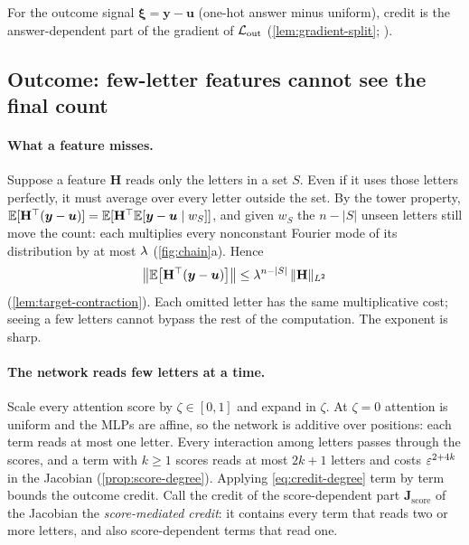 For the outcome signal $\bm\xi=\bm y-\bm u$ (one-hot answer minus uniform), credit is the answer-dependent part of the gradient of
$\mathcal L_{\mathrm{out}}$ (\cref{lem:gradient-split}; \citealp{shalevshwartz2017failures,abbe2025parities}).

\subsection{Outcome: few-letter features cannot see the final count}
\paragraph{What a feature misses.} Suppose a feature $\mathbf H$ reads only the letters in a set $S$. Even if it uses those letters perfectly,
it must average over every letter outside the set. By the tower property,
$\mathbb E[\mathbf H^\top(\bm y-\bm u)]=\mathbb E[\mathbf H^\top\mathbb E[\bm y-\bm u\mid w_S]]$, and given $w_S$ the $n-|S|$ unseen letters still move the count: each
multiplies every nonconstant Fourier mode of its distribution by at most $\lambda$ (\cref{fig:chain}a). Hence
\begin{equation}
 \bigl\|\mathbb E\bigl[\mathbf H^\top(\bm y-\bm u)\bigr]\bigr\|\le\lambda^{n-|S|}\,\|\mathbf H\|_{L^2}
 \label{eq:credit-degree}
\end{equation}
(\cref{lem:target-contraction}). Each omitted letter has the same multiplicative cost; seeing a few letters cannot bypass the rest of
the computation. The exponent is sharp.

\paragraph{The network reads few letters at a time.} Scale every attention score by $\zeta\in[0,1]$ and expand in $\zeta$. At $\zeta=0$ attention is uniform
and the MLPs are affine, so the network is additive over positions: each term reads at most one letter. Every interaction among letters
passes through the scores, and a term with $k\ge1$ scores reads at most $2k+1$ letters and costs $\varepsilon^{2+4k}$ in the Jacobian
(\cref{prop:score-degree}). Applying \cref{eq:credit-degree} term by term bounds the outcome credit. Call the credit of the score-dependent part
$\mathbf J_{\mathrm{score}}$ of the Jacobian the \emph{score-mediated credit}: it contains every term that reads two or more letters, and
also score-dependent terms that read one.

